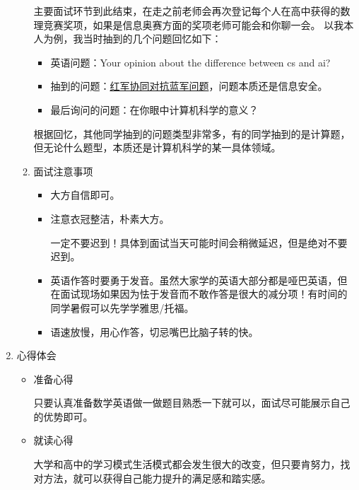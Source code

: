 \documentclass[zihao=-4,fontset=none]{Beautybook-CN}
\begin{document}
\begin{enumerate}
\begin{enumerate}
	      	      主要面试环节到此结束，在走之前老师会再次登记每个人在高中获得的数理竞赛奖项，如果是信息奥赛方面的奖项老师可能会和你聊一会。 以我本人为例，我当时抽到的几个问题回忆如下：
	      	      \begin{itemize}
	      	      	\item 英语问题：Your opinion about the difference between cs and ai?
	      	      	\item 抽到的问题：\href{https://blog.csdn.net/lzq603/article/details/110092371}{红军协同对抗蓝军问题}，问题本质还是信息安全。
	      	      	\item 最后询问的问题：在你眼中计算机科学的意义？
	      	      \end{itemize}
	      	      根据回忆，其他同学抽到的问题类型非常多，有的同学抽到的是计算题，但无论什么题型，本质还是计算机科学的某一具体领域。
	      	      	      	          
	      	\item 面试注意事项
	      	      \begin{itemize}
	      	      	\item 大方自信即可。
	      	      	\item 注意衣冠整洁，朴素大方。
	      	      	      \begin{theorem}
	      	      	      	一定不要迟到！具体到面试当天可能时间会稍微延迟，但是绝对不要迟到。
	      	      	      \end{theorem}
	      	      	\item 英语作答时要勇于发音。虽然大家学的英语大部分都是哑巴英语，但在面试现场如果因为怯于发音而不敢作答是很大的减分项！有时间的同学暑假可以先学学雅思/托福。
	      	      	\item 语速放慢，用心作答，切忌嘴巴比脑子转的快。
	      	      \end{itemize}
	      \end{enumerate}    
	      	      
	\item 心得体会 
	      \begin{itemize}
	      	\item 准备心得
	      	      	      	              
	      	      只要认真准备数学英语做一做题目熟悉一下就可以，面试尽可能展示自己的优势即可。
	      	      	      	              
	      	\item 就读心得
	      	      	      	              
	      	      大学和高中的学习模式生活模式都会发生很大的改变，但只要肯努力，找对方法，就可以获得自己能力提升的满足感和踏实感。
	      	      	      	              

\end{itemize}
\end{enumerate}
\end{document}
